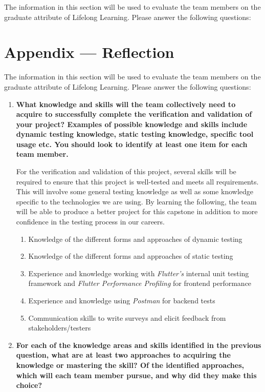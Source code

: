 \documentclass[12pt, titlepage]{article}
\begin{document}
The information in this section will be used to evaluate the team members on the
graduate attribute of Lifelong Learning.  Please answer the following questions:

\newpage{}
\section*{Appendix --- Reflection}

The information in this section will be used to evaluate the team members on the
graduate attribute of Lifelong Learning.  Please answer the following questions:

\begin{enumerate}
  \item \textbf{What knowledge and skills will the team collectively need to acquire to
  successfully complete the verification and validation of your project?
  Examples of possible knowledge and skills include dynamic testing knowledge,
  static testing knowledge, specific tool usage etc.  You should look to
  identify at least one item for each team member.}

  For the verification and validation of this project, several skills will be required
  to ensure that this project is well-tested and meets all requirements. This will involve
  some general testing knowledge as well as some knowledge specific to the technologies we
  are using. By learning the following, the team will be able to produce a better project for this
  capstone in addition to more confidence in the testing process in our careers.
  \begin{enumerate}
    \item Knowledge of the different forms and approaches of dynamic testing
    \item Knowledge of the different forms and approaches of static testing
    \item Experience and knowledge working with \textit{Flutter's} internal unit testing framework and
    \textit{Flutter Performance Profiling} for frontend performance
    \item Experience and knowledge using \textit{Postman} for backend tests
    \item Communication skills to write surveys and elicit feedback from stakeholders/testers
  \end{enumerate}

  \item \textbf{For each of the knowledge areas and skills identified in the previous
  question, what are at least two approaches to acquiring the knowledge or
  mastering the skill?  Of the identified approaches, which will each team
  member pursue, and why did they make this choice?}


\end{enumerate}
\end{document}
